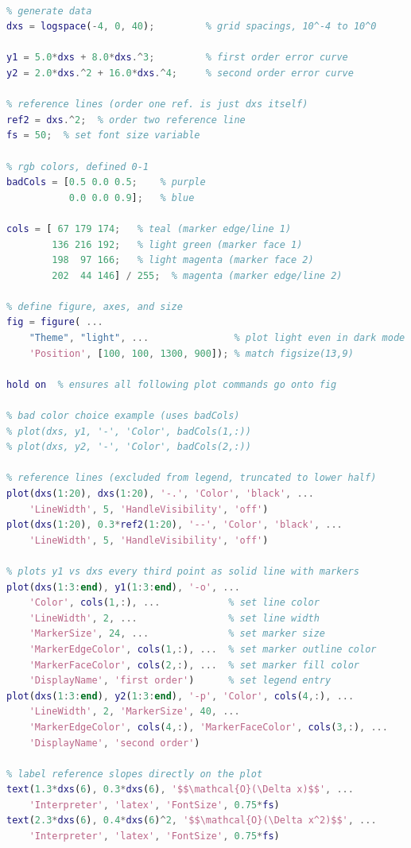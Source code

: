  \begin{lstlisting}[language=matlab]

% generate data
dxs = logspace(-4, 0, 40);         % grid spacings, 10^-4 to 10^0

y1 = 5.0*dxs + 8.0*dxs.^3;         % first order error curve
y2 = 2.0*dxs.^2 + 16.0*dxs.^4;     % second order error curve

% reference lines (order one ref. is just dxs itself)
ref2 = dxs.^2;  % order two reference line
fs = 50;  % set font size variable

% rgb colors, defined 0-1
badCols = [0.5 0.0 0.5;    % purple
           0.0 0.0 0.9];   % blue

cols = [ 67 179 174;   % teal (marker edge/line 1)
        136 216 192;   % light green (marker face 1)
        198  97 166;   % light magenta (marker face 2)
        202  44 146] / 255;  % magenta (marker edge/line 2)

% define figure, axes, and size
fig = figure( ...
    "Theme", "light", ...               % plot light even in dark mode
    'Position', [100, 100, 1300, 900]); % match figsize(13,9)

hold on  % ensures all following plot commands go onto fig

% bad color choice example (uses badCols)
% plot(dxs, y1, '-', 'Color', badCols(1,:))
% plot(dxs, y2, '-', 'Color', badCols(2,:))

% reference lines (excluded from legend, truncated to lower half)
plot(dxs(1:20), dxs(1:20), '-.', 'Color', 'black', ...
    'LineWidth', 5, 'HandleVisibility', 'off')
plot(dxs(1:20), 0.3*ref2(1:20), '--', 'Color', 'black', ...
    'LineWidth', 5, 'HandleVisibility', 'off')

% plots y1 vs dxs every third point as solid line with markers
plot(dxs(1:3:end), y1(1:3:end), '-o', ...
    'Color', cols(1,:), ...            % set line color
    'LineWidth', 2, ...                % set line width
    'MarkerSize', 24, ...              % set marker size
    'MarkerEdgeColor', cols(1,:), ...  % set marker outline color
    'MarkerFaceColor', cols(2,:), ...  % set marker fill color
    'DisplayName', 'first order')      % set legend entry
plot(dxs(1:3:end), y2(1:3:end), '-p', 'Color', cols(4,:), ...
    'LineWidth', 2, 'MarkerSize', 40, ...
    'MarkerEdgeColor', cols(4,:), 'MarkerFaceColor', cols(3,:), ...
    'DisplayName', 'second order')

% label reference slopes directly on the plot
text(1.3*dxs(6), 0.3*dxs(6), '$$\mathcal{O}(\Delta x)$$', ...
    'Interpreter', 'latex', 'FontSize', 0.75*fs)
text(2.3*dxs(6), 0.4*dxs(6)^2, '$$\mathcal{O}(\Delta x^2)$$', ...
    'Interpreter', 'latex', 'FontSize', 0.75*fs)


\end{lstlisting}
